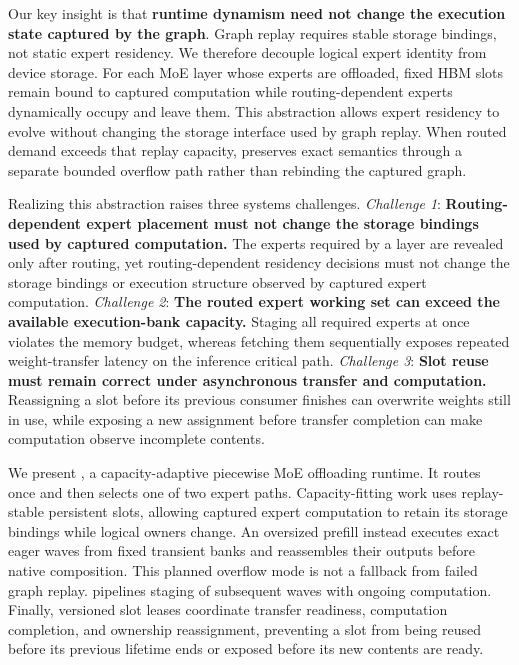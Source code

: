 Our key insight is that \textbf{runtime dynamism need not change the execution state captured by the graph}.
Graph replay requires stable storage bindings, not static expert residency.
We therefore decouple logical expert identity from device storage.
For each MoE layer whose experts are offloaded, fixed HBM slots remain bound to captured computation while routing-dependent experts dynamically occupy and leave them.
This abstraction allows expert residency to evolve without changing the storage interface used by graph replay.
When routed demand exceeds that replay capacity, \system preserves exact
semantics through a separate bounded overflow path rather than rebinding the
captured graph.


Realizing this abstraction raises three systems challenges.
\textit{Challenge 1}: \textbf{Routing-dependent expert placement must not change the storage bindings used by captured computation.}
The experts required by a layer are revealed only after routing, yet routing-dependent residency decisions must not change the storage bindings or execution structure observed by captured expert computation.
\textit{Challenge 2}: \textbf{The routed expert working set can exceed the available execution-bank capacity.}
Staging all required experts at once violates the memory budget, whereas fetching them sequentially exposes repeated weight-transfer latency on the inference critical path.
\textit{Challenge 3}: \textbf{Slot reuse must remain correct under asynchronous transfer and computation.}
Reassigning a slot before its previous consumer finishes can overwrite weights still in use, while exposing a new assignment before transfer completion can make computation observe incomplete contents.

We present \system, a capacity-adaptive piecewise MoE offloading runtime.
It routes once and then selects one of two expert paths. Capacity-fitting work
uses replay-stable persistent slots, allowing captured expert computation to
retain its storage bindings while logical owners change. An oversized prefill
instead executes exact eager waves from fixed transient banks and reassembles
their outputs before native composition. This planned overflow mode is not a
fallback from failed graph replay. \system pipelines staging of subsequent
waves with ongoing computation.
Finally, versioned slot leases coordinate transfer readiness, computation completion, and ownership reassignment, preventing a slot from being reused before its previous lifetime ends or exposed before its new contents are ready.

